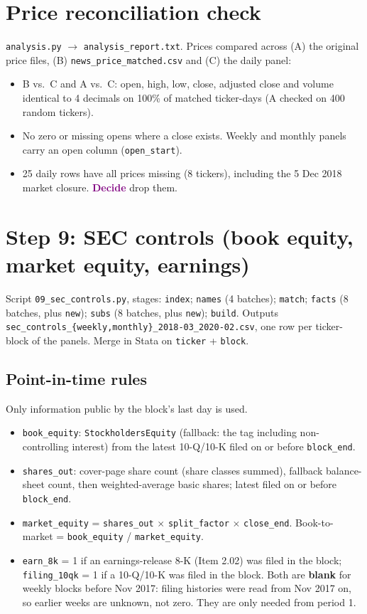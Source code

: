 \documentclass[11pt]{article}
\newcommand{\decide}{\textcolor{Purple}{\textbf{Decide}}}
\newcommand{\var}[1]{\texttt{#1}}
\begin{document}
\section{Price reconciliation check}

\var{analysis.py} $\rightarrow$ \var{analysis\_report.txt}. Prices compared across (A) the original price files, (B) \var{news\_price\_matched.csv} and (C) the daily panel:
\begin{itemize}
  \item B vs.\ C and A vs.\ C: open, high, low, close, adjusted close and volume identical to 4 decimals on 100\% of matched ticker-days (A checked on 400 random tickers).
  \item No zero or missing opens where a close exists. Weekly and monthly panels carry an open column (\var{open\_start}).
  \item 25 daily rows have all prices missing (8 tickers), including the 5 Dec 2018 market closure. \decide{} drop them.
\end{itemize}

\section{Step 9: SEC controls (book equity, market equity, earnings)}\label{sec:step9}

Script \var{09\_sec\_controls.py}, stages: \var{index}; \var{names} (4 batches); \var{match}; \var{facts} (8 batches, plus \var{new}); \var{subs} (8 batches, plus \var{new}); \var{build}. Outputs \var{sec\_controls\_\{weekly,monthly\}\_2018-03\_2020-02.csv}, one row per ticker-block of the panels. Merge in Stata on \var{ticker} + \var{block}.

\subsection{Point-in-time rules}
Only information public by the block's last day is used.
\begin{itemize}
  \item \var{book\_equity}: \var{StockholdersEquity} (fallback: the tag including non-controlling interest) from the latest 10-Q/10-K filed on or before \var{block\_end}.
  \item \var{shares\_out}: cover-page share count (share classes summed), fallback balance-sheet count, then weighted-average basic shares; latest filed on or before \var{block\_end}.
  \item \var{market\_equity} = \var{shares\_out} $\times$ \var{split\_factor} $\times$ \var{close\_end}. Book-to-market = \var{book\_equity} / \var{market\_equity}.
  \item \var{earn\_8k} = 1 if an earnings-release 8-K (Item 2.02) was filed in the block; \var{filing\_10qk} = 1 if a 10-Q/10-K was filed in the block. Both are \textbf{blank} for weekly blocks before Nov 2017: filing histories were read from Nov 2017 on, so earlier weeks are unknown, not zero. They are only needed from period 1.
\end{itemize}
\end{document}
